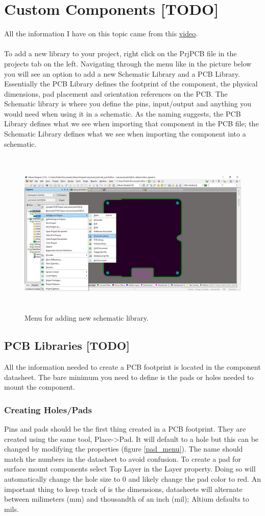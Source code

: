 \documentclass{report}
\begin{document}
	\section{Custom Components [TODO]}
	All the information I have on this topic came from this \href{https://www.youtube.com/watch?v=ozKoxXyzHC8}{video}.\\\\
	To add a new library to your project, right click on the PrjPCB file in the projects tab on the left. Navigating through the menu like in the picture below you will see an option to add a new Schematic Library and a PCB Library. Essentially the PCB Library defines the footprint of the component, the physical dimensions, pad placement and orientation references on the PCB. The Schematic library is where you define the pins, input/output and anything you would need when using it in a schematic. As the naming suggests, the PCB Library defines what we see when importing that component in the PCB file; the Schematic Library defines what we see when importing the component into a schematic.
	\begin{figure}[H]	
		\centering
		\includegraphics[width=16cm, height=8cm]{pics/new_schematic_menu.png}
		\caption{Menu for adding new schematic library.}
		\label{fig 8}
	\end{figure}
	\subsection{PCB Libraries [TODO]}
	All the information needed to create a PCB footprint is located in the component datasheet. The bare minimum you need to define is the pads or holes needed to mount the component.
	\subsubsection{Creating Holes/Pads}
	Pins and pads should be the first thing created in a PCB footprint. They are created using the same tool, Place->Pad. It will default to a hole but this can be changed by modifying the properties (figure \ref{pad_menu}). The name should match the numbers in the datasheet to avoid confusion. To create a pad for surface mount components select Top Layer in the Layer property. Doing so will automatically change the hole size to 0 and likely change the pad color to red. An important thing to keep track of is the dimensions, datasheets will alternate between milimeters (mm) and thousandth of an inch (mil); Altium defaults to mils.
	
\end{document}
